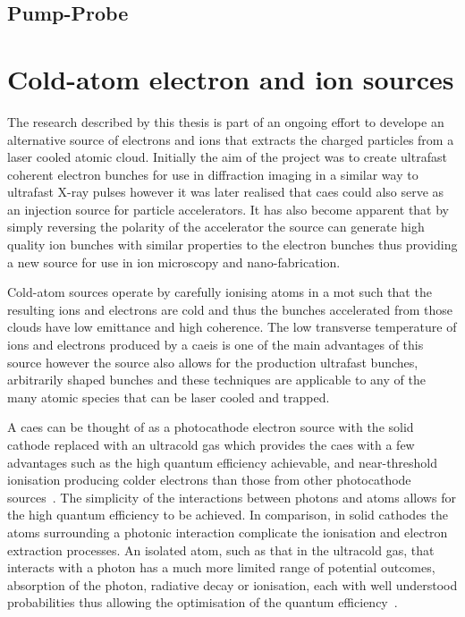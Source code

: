 \subsection{Pump-Probe}

\section{Cold-atom electron and ion sources}

The research described by this thesis is part of an ongoing effort to develope an alternative source of electrons and ions that extracts the charged particles from a laser cooled atomic cloud.
Initially the aim of the project was to create ultrafast coherent electron bunches for use in diffraction imaging in a similar way to ultrafast X-ray pulses however it was later realised that \gls{caes} could also serve as an injection source for particle accelerators.
It has also become apparent that by simply reversing the polarity of the accelerator the source can generate high quality ion bunches with similar properties to the electron bunches thus providing a new source for use in ion microscopy and nano-fabrication.

Cold-atom sources operate by carefully ionising atoms in a \gls{mot} such that the resulting ions and electrons are cold and thus the bunches accelerated from those clouds have low emittance and high coherence.
The low transverse temperature of ions and electrons produced by a \gls{caeis} is one of the main advantages of this source however the source also allows for the production ultrafast bunches, arbitrarily shaped bunches and these techniques are applicable to any of the many atomic species that can be laser cooled and trapped.

A \gls{caes} can be thought of as a photocathode electron source with the solid cathode replaced with an ultracold gas which provides the \gls{caes} with a few advantages such as the high quantum efficiency achievable, and near-threshold ionisation producing colder electrons than those from other photocathode sources~\cite{engelen_effective_2014}.
The simplicity of the interactions between photons and atoms allows for the high quantum efficiency to be achieved.
In comparison, in solid cathodes the atoms surrounding a photonic interaction complicate the ionisation and electron extraction processes.
An isolated atom, such as that in the ultracold gas, that interacts with a photon has a much more limited range of potential outcomes, absorption of the photon, radiative decay or ionisation, each with well understood probabilities thus allowing the optimisation of the quantum efficiency~\cite{baranov_on_1994}.

